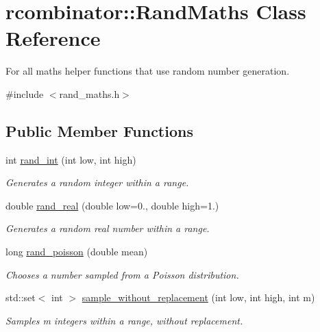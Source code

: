 \hypertarget{classrcombinator_1_1RandMaths}{}\section{rcombinator\+:\+:Rand\+Maths Class Reference}
\label{classrcombinator_1_1RandMaths}


For all maths helper functions that use random number generation.  




{\ttfamily \#include $<$rand\+\_\+maths.\+h$>$}

\subsection*{Public Member Functions}
\begin{DoxyCompactItemize}
\item 
int \mbox{\hyperlink{classrcombinator_1_1RandMaths_ae417da209eb8a9d1b2217e7a5397926c}{rand\+\_\+int}} (int low, int high)
\begin{DoxyCompactList}\small\item\em Generates a random integer within a range. \end{DoxyCompactList}\item 
double \mbox{\hyperlink{classrcombinator_1_1RandMaths_aa6441baa59bff50f588c0c54e3c54140}{rand\+\_\+real}} (double low=0., double high=1.)
\begin{DoxyCompactList}\small\item\em Generates a random real number within a range. \end{DoxyCompactList}\item 
long \mbox{\hyperlink{classrcombinator_1_1RandMaths_a1fec117f0ebd5a7834fdcf649a23edd7}{rand\+\_\+poisson}} (double mean)
\begin{DoxyCompactList}\small\item\em Chooses a number sampled from a Poisson distribution. \end{DoxyCompactList}\item 
std\+::set$<$ int $>$ \mbox{\hyperlink{classrcombinator_1_1RandMaths_a2c31949c9ac03952cb0006e6a88e3d85}{sample\+\_\+without\+\_\+replacement}} (int low, int high, int m)
\begin{DoxyCompactList}\small\item\em Samples {\itshape m} integers within a range, without replacement. \end{DoxyCompactList}\item 

\end{DoxyCompactItemize}
